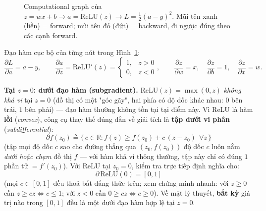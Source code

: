 \documentclass[12pt,a4paper]{report}
\makeatletter
\newcommand{\en}[1]{\textit{#1}}
\renewcommand\small{\@setfontsize\small{13}{16.5}}
\makeatother
\begin{document}
\begin{figure}[htbp]
\centering
{}
\caption{Computational graph của $z=wx+b \to a=\mathrm{ReLU}(z) \to L=\tfrac12(a-y)^2$.
Mũi tên xanh (liền) = forward; mũi tên đỏ (đứt) = backward, đi ngược đúng
theo các cạnh forward.}
\label{fig:compgraph}
\end{figure}

Đạo hàm cục bộ của từng nút trong Hình~\ref{fig:compgraph}:
$$\frac{\partial L}{\partial a}=a-y,\qquad
\frac{\partial a}{\partial z}=\mathrm{ReLU}'(z)=\begin{cases}1,& z>0\\0,& z< 0\end{cases},\qquad
\frac{\partial z}{\partial w}=x,\quad \frac{\partial z}{\partial b}=1,\quad \frac{\partial z}{\partial x}=w.$$

\textbf{Tại $z=0$: dưới đạo hàm (subgradient).} $\mathrm{ReLU}(z)=\max(0,z)$
\emph{không khả vi} tại $z=0$ (đồ thị có một "góc gãy", hai phía có độ dốc
khác nhau: $0$ bên trái, $1$ bên phải) --- đạo hàm thường không tồn tại tại
điểm này. Vì ReLU là hàm \textbf{lồi} (\en{convex}), công cụ thay thế đúng
đắn về giải tích là \textbf{tập dưới vi phân} (\en{subdifferential}):
$$\partial f(z_0) \triangleq \{\,c\in\mathbb R : f(z) \ge f(z_0) + c\,(z-z_0)\ \ \forall z\,\}$$
(tập mọi độ dốc $c$ sao cho đường thẳng qua $(z_0,f(z_0))$ độ dốc $c$ luôn
nằm \emph{dưới hoặc chạm} đồ thị $f$ --- với hàm khả vi thông thường, tập
này chỉ có đúng $1$ phần tử $=f'(z_0)$). Với $\mathrm{ReLU}$ tại $z_0=0$,
kiểm tra trực tiếp định nghĩa cho:
$$\partial\,\mathrm{ReLU}(0) = [0,1]$$
(mọi $c\in[0,1]$ đều thoả bất đẳng thức trên; xem chứng minh nhanh:
với $z\ge0$ cần $z\ge cz\Leftrightarrow c\le1$; với $z<0$ cần $0\ge cz
\Leftrightarrow c\ge0$). Về mặt lý thuyết, \textbf{bất kỳ} giá trị nào
trong $[0,1]$ đều là một dưới đạo hàm hợp lệ tại $z=0$.
\end{document}
